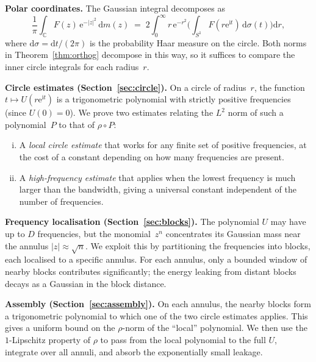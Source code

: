 \documentclass[11pt]{amsart}
\theoremstyle{definition}
\theoremstyle{remark}
\newcommand{\C}{\mathbb{C}}
\newcommand{\abs}[1]{\lvert #1 \rvert}
\newcommand{\dd}{\mathrm{d}}
\newcommand{\ii}{\mathrm{i}}
\newcommand{\ee}{\mathrm{e}}
\newcommand{\rhoFn}{\rho}
\begin{document}
\medskip
\noindent
\textbf{Polar coordinates.}\;
The Gaussian integral decomposes as
\begin{equation}\label{eq:polar}
\frac{1}{\pi}\int_{\C} F(z)\, \ee^{-\abs{z}^2}\,\dd m(z)
\;=\;
2\int_0^\infty r\,\ee^{-r^2}
\biggl(\int_{S^1} F(r\ee^{\ii t})\,\dd\sigma(t)\biggr)\dd r,
\end{equation}
where $\dd\sigma = \dd t/(2\pi)$ is the probability Haar measure on the
circle.  Both norms in Theorem~\ref{thm:orthog} decompose in this way, so it
suffices to compare the inner circle integrals for each radius~$r$.

\medskip
\noindent
\textbf{Circle estimates (Section~\ref{sec:circle}).}\;
On a circle of radius~$r$, the function $t \mapsto U(r\ee^{\ii t})$ is a
trigonometric polynomial with strictly positive frequencies (since
$U(0) = 0$).  We prove two estimates relating the $L^2$ norm of such a
polynomial~$P$ to that of $\rhoFn \circ P$:
\begin{enumerate}[(i)]
\item A \emph{local circle estimate} that works for any finite set of
  positive frequencies, at the cost of a constant depending on how many
  frequencies are present.

\item A \emph{high-frequency estimate} that applies when the lowest
  frequency is much larger than the bandwidth, giving a universal constant
  independent of the number of frequencies.
\end{enumerate}

\medskip
\noindent
\textbf{Frequency localisation (Section~\ref{sec:blocks}).}\;
The polynomial $U$ may have up to $D$ frequencies, but the monomial~$z^n$
concentrates its Gaussian mass near the annulus $\abs{z} \approx \sqrt{n}$.
We exploit this by partitioning the frequencies into blocks, each localised
to a specific annulus.  For each annulus, only a bounded window of nearby
blocks contributes significantly; the energy leaking from distant blocks
decays as a Gaussian in the block distance.

\medskip
\noindent
\textbf{Assembly (Section~\ref{sec:assembly}).}\;
On each annulus, the nearby blocks form a trigonometric polynomial to which
one of the two circle estimates applies.  This gives a uniform bound on the
$\rhoFn$-norm of the ``local'' polynomial.  We then use the $1$-Lipschitz
property of $\rhoFn$ to pass from the local polynomial to the full $U$,
integrate over all annuli, and absorb the exponentially small leakage.
\end{document}
